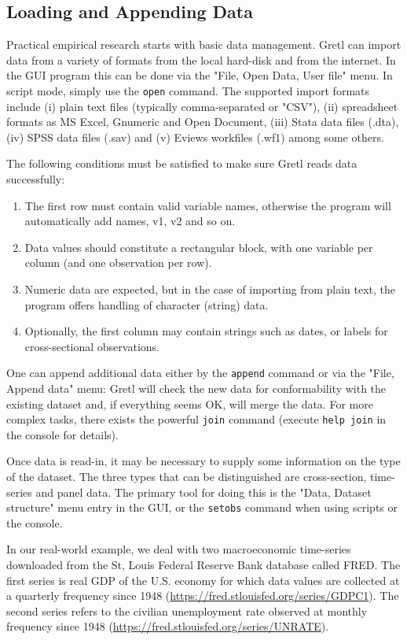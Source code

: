 \documentclass[11pt]{article}
\begin{document}
\subsection{Loading and Appending Data}
\label{sec:dataloadappend}
Practical empirical research starts with basic data management. Gretl can import data from a variety of formats from the local hard-disk and from the internet. In the GUI program this can be done via the "File, Open Data, User file" menu. In script mode, simply use the \texttt{open} command. The supported import formats include (i) plain text files (typically comma-separated or "CSV"), (ii) spreadsheet formats as MS Excel, Gnumeric and Open Document, (iii) Stata data files (.dta), (iv) SPSS data files (.sav) and (v) Eviews workfiles (.wf1) among some others.

The following conditions must be satisfied to make sure Gretl reads data successfully:
\begin{enumerate}
	\item The first row must contain valid variable names, otherwise the program will automatically add names, v1, v2 and so on.
	\item Data values should constitute a rectangular block, with one variable per column (and one observation per row).
	\item Numeric data are expected, but in	the case of importing from plain text, the program offers handling of character (string) data.
	\item Optionally, the first column may contain strings such as	dates, or labels for cross-sectional observations.
\end{enumerate}

One can append additional data either by the \texttt{append} command or via the "File, Append data" menu: Gretl will check the
new data for conformability with the existing dataset and, if everything seems OK, will merge the data. For more complex tasks, there exists the powerful \texttt{join} command (execute \texttt{help join} in the console for details).

Once data is read-in, it may be necessary to supply some information on the type of the dataset. The three types that can be distinguished are cross-section, time-series and panel data. The primary tool for doing this is the "Data, Dataset structure" menu entry in the GUI, or the \texttt{setobs} command when using scripts or the console.

In our real-world example, we deal with two macroeconomic time-series downloaded from the St, Louis Federal Reserve Bank database called FRED. %
The first series is real GDP of the U.S. economy for which data values are collected at a quarterly frequency since 1948 (\url{https://fred.stlouisfed.org/series/GDPC1}). The second series refers to the civilian unemployment rate observed at monthly frequency since 1948 (\url{https://fred.stlouisfed.org/series/UNRATE}).
\end{document}
